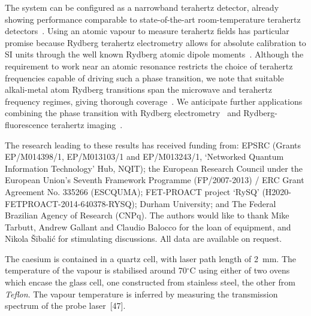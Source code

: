 \documentclass[twocolumn,aps,prl,nobibnotes,8pt]{revtex4-1}
\begin{document}
The system can be configured as a narrowband terahertz detector, already showing performance comparable to state-of-the-art room-temperature terahertz detectors~\cite{Sizov10}. 
Using an atomic vapour to measure terahertz fields has particular promise because  Rydberg terahertz electrometry allows for absolute calibration to SI units through the well known Rydberg atomic dipole moments~\cite{Simons16a}. 
Although the requirement to work near an atomic resonance restricts the choice of terahertz frequencies capable of driving such a phase transition, we note that suitable alkali-metal atom Rydberg transitions span the microwave and terahertz frequency regimes, giving thorough coverage~\cite{Wade17}. 
We anticipate further applications combining the phase transition with Rydberg electrometry~\cite{Sedlacek12} and Rydberg-fluorescence terahertz imaging~\cite{Wade17}. 



\vspace{1cm}

The research leading to these results has received funding from: EPSRC (Grants EP/M014398/1, EP/M013103/1 and EP/M013243/1, `Networked Quantum Information Technology' Hub, NQIT); the European Research Council under the European Union's Seventh Framework Programme (FP/2007-2013) / ERC Grant Agreement No. 335266 (ESCQUMA); FET-PROACT project `RySQ' (H2020-FETPROACT-2014-640378-RYSQ); Durham University; and The Federal Brazilian Agency of Research (CNPq).
The authors would like to thank Mike Tarbutt, Andrew Gallant and Claudio Balocco for the loan of equipment, and Nikola \v{S}ibali\'{c} for stimulating discussions.
All data are available on request.

\vspace{1cm}

\vspace{0.3cm}

 The caesium is contained in a quartz cell, with laser path length of 2~mm. 
The temperature of the vapour is stabilised around 70$^{\circ}$C using either of two ovens which encase the glass cell, one constructed from stainless steel, the other from \emph{Teflon}. 
The vapour temperature is inferred by measuring the transmission spectrum of the probe laser~[47].
\vspace{0.2cm}
\end{document}
